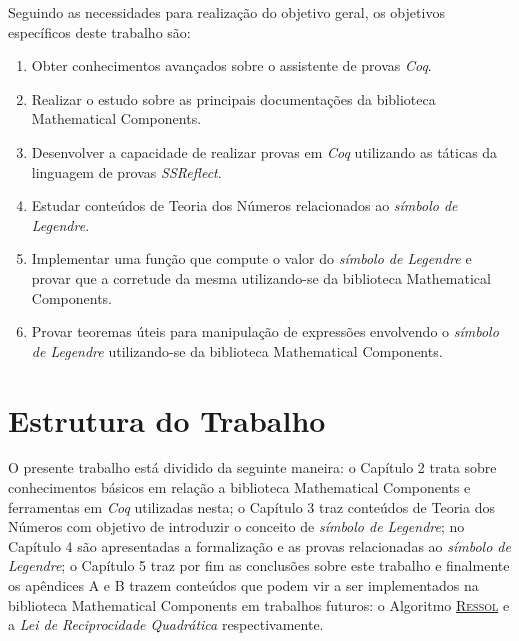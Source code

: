 Seguindo as necessidades para realização do objetivo geral, os objetivos específicos deste trabalho são:

\begin{enumerate}
    \item Obter conhecimentos avançados sobre o assistente de provas \textit{Coq}.
    \item Realizar o estudo sobre as principais documentações da biblioteca Mathematical Components.
    \item Desenvolver a capacidade de realizar provas em \textit{Coq} utilizando as táticas da linguagem de provas \textit{SSReflect}.
    \item Estudar conteúdos de Teoria dos Números relacionados ao \textit{símbolo de Legendre}.
    \item \label{obj:func} Implementar uma função que compute o valor do \textit{símbolo de Legendre} e provar que a corretude da mesma utilizando-se da biblioteca Mathematical Components.
    \item \label{obj:proofs} Provar teoremas úteis para manipulação de expressões envolvendo o \textit {símbolo de Legendre} utilizando-se da biblioteca Mathematical Components.
\end{enumerate}
 
\section{Estrutura do Trabalho}

O presente trabalho está dividido da seguinte maneira: o Capítulo 2 trata sobre conhecimentos básicos em relação a biblioteca Mathematical Components e ferramentas em \textit{Coq} utilizadas nesta; o Capítulo 3 traz conteúdos de Teoria dos Números com objetivo de introduzir o conceito de \textit{símbolo de Legendre}; no Capítulo 4 são apresentadas a formalização e as provas relacionadas ao \textit{símbolo de Legendre}; o Capítulo 5 traz por fim as conclusões sobre este trabalho e finalmente os apêndices A e B trazem conteúdos que podem vir a ser implementados na biblioteca Mathematical Components em trabalhos futuros: o Algoritmo \hyperref[algo:ressol]{\textsc{Ressol}} e a \textit{Lei de Reciprocidade Quadrática} respectivamente.

